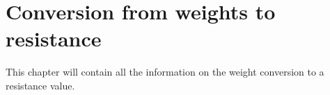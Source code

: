 \section{Conversion from weights to resistance}
\label{sec:wei2res}

This chapter will contain all the information on the weight conversion to a resistance value.
